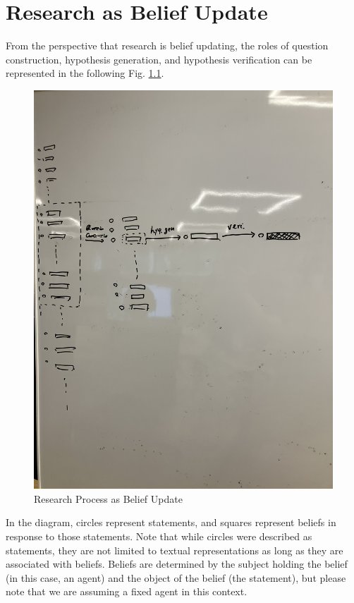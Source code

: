 \documentclass{book}
\begin{document}
\chapter{Research as Belief Update}

From the perspective that research is belief updating, the roles of question construction, hypothesis generation, and hypothesis verification can be represented in the following Fig. \ref{fig:beliefupdate}. 
\begin{figure}[htb]
    \centering
    \includegraphics[width=\textwidth]{figs/beliefupdate.jpg}
    \caption{Research Process as Belief Update}
    \label{fig:beliefupdate}
\end{figure}
In the diagram, circles represent statements, and squares represent beliefs in response to those statements. Note that while circles were described as statements, they are not limited to textual representations as long as they are associated with beliefs. Beliefs are determined by the subject holding the belief (in this case, an agent) and the object of the belief (the statement), but please note that we are assuming a fixed agent in this context.
\end{document}
